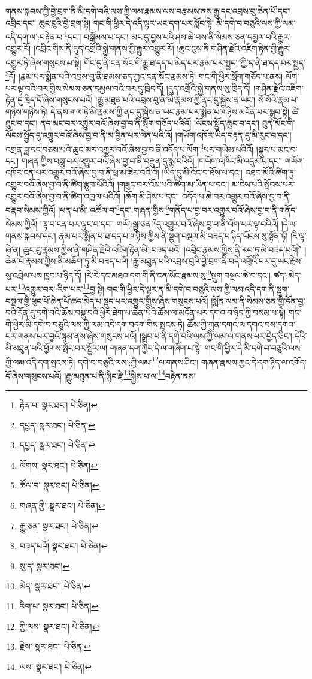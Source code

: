 གནས་སྐབས་ཀྱི་བྱེ་བྲག་ནི་མི་དགེ་བའི་ལས་ཀྱི་ལམ་རྣམས་ལས་བརྩམས་ནས་རྒྱུ་དང་འབྲས་བུ་ཆེན་པོ་དང་། འབྲིང་དང་། ཆུང་ངུའི་བྱེ་བྲག་སྟེ། གང་གི་ཕྱིར་དེ་འདི་ལྟར་ཡང་དག་པར་སློབ་སྟེ། མི་དགེ་བ་བཅུའི་ལས་ཀྱི་ལམ་འདི་དག་ལ་:བརྟེན་པ་\footnote{རྟེན་པ་  སྣར་ཐང་།  པེ་ཅིན། }དང་། བསྒོམས་པ་དང་། མང་དུ་བྱས་པའི་ཤས་ཆེ་བས་ནི་སེམས་ཅན་དམྱལ་བའི་རྒྱུར་འགྱུར་རོ། །འབྲིང་གིས་ནི་དུད་འགྲོའི་སྐྱེ་གནས་ཀྱི་རྒྱུར་འགྱུར་རོ། །ཆུང་ངུས་ནི་གཤིན་རྗེའི་འཇིག་རྟེན་གྱི་རྒྱུར་འགྱུར་ཏེ་ཞེས་གསུངས་པ་སྟེ། གོང་དུ་ནི་ངན་སོང་གི་རྒྱུ་ཐ་དད་པ་མེད་པར་རྣམ་པར་སྤྱད་\footnote{དཔྱད་  སྣར་ཐང་།  པེ་ཅིན། }ཀྱི་ད་ནི་ཐ་དད་པར་སྤྱད་\footnote{དཔྱད་  སྣར་ཐང་།  པེ་ཅིན། }དོ། །རྣམ་པར་སྨིན་པའི་འབྲས་བུ་ནི་ཐམས་ཅད་ཀྱང་ངན་སོང་རྣམས་ཏེ། གང་གི་ཕྱིར་སྲོག་གཅོད་པ་ནས། ལོག་པར་ལྟ་བའི་བར་གྱིས་སེམས་ཅན་དམྱལ་བའི་བར་དུ་ཁྲིད་དོ། །དུད་འགྲོའི་སྐྱེ་གནས་སུ་ཁྲིད་དོ། །གཤིན་རྗེའི་འཇིག་རྟེན་དུ་ཁྲིད་དོ་ཞེས་གསུངས་པའོ། །རྒྱུ་མཐུན་པའི་འབྲས་བུ་ནི་མི་རྣམས་ཀྱི་ནང་དུ་སྐྱེས་ན་ཡང་། སོ་སོའི་རྣམ་པ་གཉིས་གཉིས་ཏེ། དེ་ནས་གལ་ཏེ་མི་རྣམས་ཀྱི་ནང་དུ་སྐྱེས་ན་ཡང་རྣམ་པར་སྨིན་པ་གཉིས་མངོན་པར་སྒྲུབ་སྟེ། ཚེ་ཐུང་བ་དང་། ནད་མང་བར་འགྱུར་བའོ་ཞེས་བྱ་བ་ནི་སྲོག་གཅོད་པའིའོ། །ལོངས་སྤྱོད་ཆུང་བ་དང་། ཐུན་མོང་གི་ལོངས་སྤྱོད་དུ་འགྱུར་བའོ་ཞེས་བྱ་བ་ནི་མ་བྱིན་པར་ལེན་པའི་འོ། །གཡོག་འཁོར་ཡིད་བརྟན་དུ་མི་རུང་བ་དང་། འགྲན་ཟླ་དང་བཅས་པའི་ཆུང་མར་འགྱུར་བའོ་ཞེས་བྱ་བ་ནི་འདོད་པ་ལོག་\footnote{ལོགས་  སྣར་ཐང་།  པེ་ཅིན། }པར་གཡེམ་པའིའོ། །སྐུར་པ་མང་བ་དང་། གཞན་གྱིས་བསླུ་བར་འགྱུར་བའོ་ཞེས་བྱ་བ་ནི་བརྫུན་དུ་སྨྲ་བའིའོ། །གཡོག་འཁོར་མི་འདུམ་པ་དང་། གཡོག་འཁོར་ངན་པར་འགྱུར་བའོ་ཞེས་བྱ་བ་ནི་ཕྲ་མ་ཟེར་བའི་འོ། །ཡིད་དུ་མི་འོང་བ་ཐོས་པ་དང་། འཐབ་མོའི་ཚིག་ཏུ་འགྱུར་བའོ་ཞེས་བྱ་བ་ནི་ཚིག་རྩུབ་པོའིའོ། །གཟུང་བར་འོས་པའི་ཚིག་མ་ཡིན་པ་དང་། མ་ངེས་པའི་སྤོབས་པར་འགྱུར་བའོ་ཞེས་བྱ་བ་ནི་ཚིག་འཁྱལ་པའིའོ། །ཆོག་མི་ཤེས་པ་དང་། འདོད་པ་ཆེ་བར་འགྱུར་བའོ་ཞེས་བྱ་བ་ནི་བརྣབ་སེམས་ཀྱིའོ། །ཕན་པ་མི་:འཚོལ་བ་\footnote{ཚོལ་བ་  སྣར་ཐང་།  པེ་ཅིན། }དང་:གཞན་གྱིས་\footnote{གཞན་གྱི་  སྣར་ཐང་།  པེ་ཅིན། }གནོད་པ་བྱ་བར་འགྱུར་བའོ་ཞེས་བྱ་བ་ནི་གནོད་སེམས་ཀྱིའོ། །ལྟ་བ་ངན་པར་ལྟུང་བ་དང་། གཡོ་:སྒྱུ་ཅན་\footnote{རྒྱུ་ཅན་  སྣར་ཐང་།  པེ་ཅིན། }དུ་འགྱུར་བའོ་ཞེས་བྱ་བ་ནི་ལོག་པར་ལྟ་བའིའོ། །དེ་ལ་གནས་སྐབས་དང་། རྣམ་པར་སྨིན་པ་ཐ་དད་པ་གཉིས་ཀྱིས་ནི་སྡུག་བསྔལ་མི་བཟད་པ་ཉིད་ཡོངས་སུ་སྟོན་ཏོ། །ཇི་ལྟ་ཞེ་ན། ཆུང་ངུ་རྣམས་ཀྱིས་ནི་གཤིན་རྗེའི་འཇིག་རྟེན་མི་:བཟད་པའོ། །འབྲིང་རྣམས་ཀྱིས་ནི་རབ་ཏུ་མི་བཟད་པའོ།\footnote{བཟད་པའོ།  སྣར་ཐང་།  པེ་ཅིན། } །ཆེན་པོ་རྣམས་ཀྱིས་ནི་མཆོག་ཏུ་མི་བཟད་པའོ། །རྒྱུ་མཐུན་པའི་འབྲས་བུའི་བྱེ་བྲག་ནི་བདེ་འགྲོའི་བར་དུ་ཡང་རྗེས་སུ་འབྲེལ་པས་ཁྱབ་པ་ཉིད་དོ། །རེ་རེ་དང་མཐའ་དག་གི་ནི་ངན་སོང་རྣམས་སུ་\footnote{སུ་ད་  སྣར་ཐང་། }སྡུག་བསྔལ་ཆེ་བ་དང་། ཚད་:མེད་པར་\footnote{མེད་  སྣར་ཐང་།  པེ་ཅིན། }འགྱུར་བར་:རིག་པར་\footnote{རིག་པ་  སྣར་ཐང་།  པེ་ཅིན། }བྱ་སྟེ། གང་གི་ཕྱིར་དེ་ལྟར་ན་མི་དགེ་བ་བཅུའི་ལས་ཀྱི་ལམ་འདི་དག་ནི་སྡུག་བསྔལ་གྱི་ཕུང་པོ་ཆེན་པོ་ཚད་མེད་པ་སྡུད་པར་འགྱུར་གྱིས་ཞེས་གསུངས་པའོ། །སྨོན་ལམ་ནི་སེམས་ཅན་གྱི་དོན་བྱ་བའི་དོན་དུ་དགེ་བའི་ཆོས་བསྡུ་བའི་ཕྱིར་ཐེག་པ་ཆེན་པོའི་ཆོས་ལ་མངོན་པར་དགའ་བ་ཉིད་ཀྱི་བསམ་པ་སྟེ། གང་གི་ཕྱིར་མི་དགེ་བ་བཅུའི་ལས་ཀྱི་ལམ་འདི་དག་བདག་གིས་སྤངས་ཏེ། ཆོས་ཀྱི་ཀུན་དགའ་ལ་དགའ་བས་དགའ་བར་གནས་པར་བྱའོ་སྙམ་ནས་ཞེས་གསུངས་པའོ། །སྒྲུབ་པ་ནི་དགེ་བའི་ལས་ཀྱི་ལམ་ལ་གནས་པར་བྱེད་ཅིང་། དེའི་མི་མཐུན་པའི་ཕྱོགས་སྤོང་བར་སྦྱོར་ལ། གཞན་དག་ཀྱང་དེ་ལ་གཞོག་པ་སྟེ། གང་གི་ཕྱིར་དེ་མི་དགེ་བ་བཅུའི་ལས་ཀྱི་ལམ་འདི་དག་སྤངས་ཏེ། དགེ་བ་བཅུའི་ལས་:ཀྱི་ལམ་\footnote{ཀྱི་ལས་  སྣར་ཐང་།  པེ་ཅིན། }ལ་གནས་ཤིང་། གཞན་རྣམས་ཀྱང་དེ་དག་ཉིད་ལ་འགོད་དོ་ཞེས་གསུངས་པའོ། །རྒྱུ་མཐུན་པ་ནི་སྙིང་རྗེ་\footnote{རྗེས་  སྣར་ཐང་།  པེ་ཅིན། }སྐྱེས་པ་ལ་\footnote{ལས་  སྣར་ཐང་།  པེ་ཅིན། }བརྟེན་ནས། 